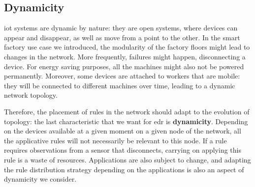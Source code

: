 \documentclass{iosart2c}
\newcommand{\Nicolas}[1]{\textcolor{red}{ Nicolas: \textbf{#1} }}
\begin{document}
\subsection{Dynamicity}

\gls{iot} systems are dynamic by nature: they are open systems, where devices can appear and disappear, as well as move from a point to the other. 
In the smart factory use case we introduced, the modularity of the factory floors might lead to changes in the network.
More frequently, failures might happen, disconnecting a device. 
For energy saving purposes, all the machines might also not be powered permanently.
Moreover, some devices are attached to workers that are mobile: they will be connected to different machines over time, leading to a dynamic network topology.

Therefore, the placement of rules in the network should adapt to the evolution of topology: the last characteristic that we want for \gls{edr} is \textbf{dynamicity}.
Depending on the devices available at a given moment on a given node of the network, all the applicative rules will not necessarily be relevant to this node.
If a rule requires observations from a sensor that disconnects, carrying on applying this rule is a waste of resources. 
Applications are also subject to change, and adapting the rule distribution strategy depending on the applications is also an aspect of dynamicity we consider.

\end{document}
